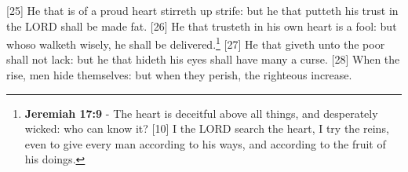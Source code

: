 [25] \textcolor[cmyk]{0.99998,1,0,0}{He that is of a proud heart stirreth up strife: but he that putteth his trust in the LORD shall be made fat.}
[26] \textcolor[cmyk]{0.99998,1,0,0}{He that trusteth in his own heart is a fool: but whoso walketh wisely, he shall be delivered.}\footnote{\textbf{Jeremiah 17:9} - The heart is deceitful above all things, and desperately wicked: who can know it? [10] I the LORD search the heart, I try the reins, even to give every man according to his ways, and according to the fruit of his doings.}
[27] \textcolor[cmyk]{0.99998,1,0,0}{He that giveth unto the poor shall not lack: but he that hideth his eyes shall have many a curse.}
[28] \textcolor[cmyk]{0.99998,1,0,0}{When the  rise, men hide themselves: but when they perish, the righteous increase.}



